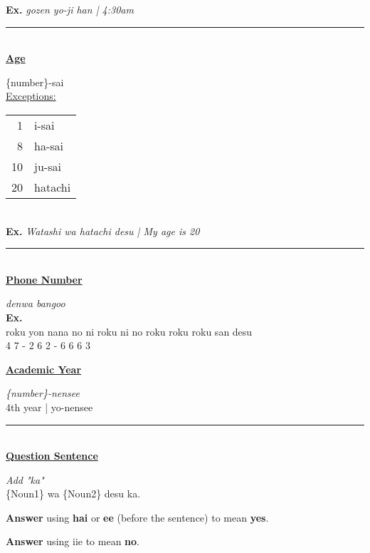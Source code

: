 \documentclass{article}
\begin{document}
{\bf Ex.} {\it gozen yo-ji han | 4:30am}\\

\rule{6in}{0.4pt}\\

\underline{\bf Age}

\{number\}-sai\\

\underline{Exceptions:}

\begin{tabular}{ r l }
1 & i-sai\\
8 & ha-sai\\
10 & ju-sai\\
20 & hatachi\\
\end{tabular}\\

{\bf Ex.} {\it Watashi wa hatachi desu | My age is 20}\\

\rule{6in}{0.4pt}\\

\underline{\bf Phone Number}

{\it denwa bangoo}\\

{\bf Ex.}\\
\indent roku yon nana no ni roku ni no roku roku roku san desu\\
 4 7 - 2 6 2 - 6 6 6 3\\

\newpage

\underline{\bf Academic Year}

{\it \{number\}-nensee}\\

4th year | yo-nensee\\

\rule{6in}{0.4pt}\\

\underline{\bf \large Question Sentence}

{\it Add "ka"}\\

\{Noun1\} wa \{Noun2\} desu ka.

{\bf Answer} using {\bf hai} or {\bf ee} (before the sentence) to mean {\bf yes}.

{\bf Answer} using {iie} to mean {\bf no}.\\
\end{document}
